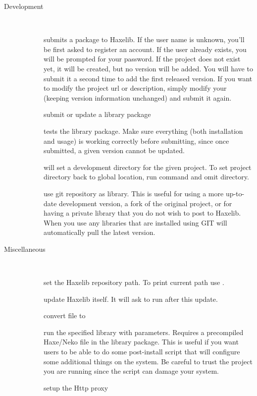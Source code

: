 \begin{description}
	\item[Development] \\
		\begin{description}
			\item[] submits a package to Haxelib. If the user name is unknown, you'll be first asked to register an account. If the user already exists, you will be prompted for your password. If the project does not exist yet, it will be created, but no version will be added. You will have to submit it a second time to add the first released version. If you want to modify the project url or description, simply modify your  (keeping version information unchanged) and submit it again.
			\item[] submit or update a library package
			\item[] tests the library package. Make sure everything (both installation and usage) is working correctly before submitting, since once submitted, a given version cannot be updated.
			\item[] will set a development directory for the given project. To set project directory back to global location, run command and omit directory.
			\item[] use git repository as library. This is useful for using a more up-to-date development version, a fork of the original project, or for having a private library that you do not wish to post to Haxelib. When you use  any libraries that are installed using GIT will automatically pull the latest version.
		\end{description}
		
	\item[Miscellaneous] \\
		\begin{description}
			\item[] set the Haxelib repository path. To print current path use .
			\item[] update Haxelib itself. It will ask to run  after this update.
			\item[] convert  file to 
			\item[] run the specified library with parameters. Requires  a precompiled Haxe/Neko  file in the library package. This is useful if you want users to be able to do some post-install script that will configure some additional things on the system. Be careful to trust the project you are running since the script can damage your system.
			\item[] setup the Http proxy
		\end{description}
\end{description}
